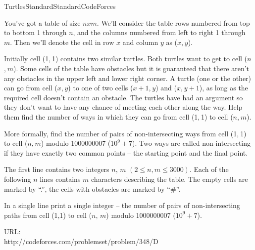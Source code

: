 \begin{problema}{Turtles}{Standard}{Standard}{CodeForces} 

You've got a table of size $n x m$. We'll consider the table rows numbered from top to bottom 1 through $n$, and the columns numbered from left to right 1 through $m$. Then we'll denote the cell in row $x$ and column $y$ as ($x$, $y$).

Initially cell (1, 1) contains two similar turtles. Both turtles want to get to cell ($n$, $m$). Some cells of the table have obstacles but it is guaranteed that there aren't any obstacles in the upper left and lower right corner. A turtle (one or the other) can go from cell ($x$, $y$) to one of two cells ($x + 1$, $y$) and ($x$, $y + 1$), as long as the required cell doesn't contain an obstacle. The turtles have had an argument so they don't want to have any chance of meeting each other along the way. Help them find the number of ways in which they can go from cell (1, 1) to cell ($n$, $m$).

More formally, find the number of pairs of non-intersecting ways from cell (1, 1) to cell ($n$, $m$) modulo 1000000007 ($10^9 + 7$). Two ways are called non-intersecting if they have exactly two common points -- the starting point and the final point. \\

\InputFile

The first line contains two integers $n$, $m$  $(2 \leq n,m \leq 3000)$. Each of the following $n$ lines contains $m$ characters describing the table. The empty cells are marked by ``.'', the cells with obstacles are marked by ``\#''. \\


\OutputFile

In a single line print a single integer -- the number of pairs of non-intersecting paths from cell (1,1) to cell ($n$, $m$) modulo 1000000007 ($10^9 + 7$). \\


\Example



URL: \\
http://codeforces.com/problemset/problem/348/D

\end{problema}
